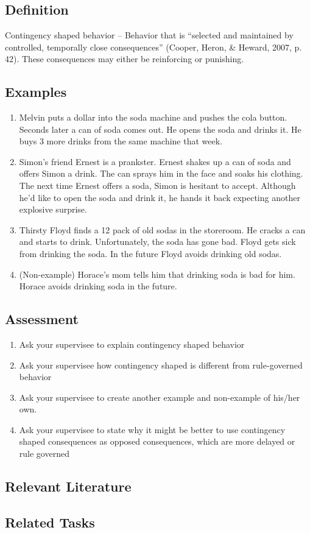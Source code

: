 \clearpage \section{\fourFKFourtyOne{}}
\subsection{Definition}
Contingency shaped behavior – Behavior that is ``selected and maintained by controlled, temporally close consequences'' (Cooper, Heron, \& Heward, 2007, p. 42).  These consequences may either be reinforcing or punishing.  
%
\subsection{Examples}
\begin{enumerate}
\item Melvin puts a dollar into the soda machine and pushes the cola button. Seconds later a can of soda comes out. He opens the soda and drinks it.  He buys 3 more drinks from the same machine that week.
\item Simon's friend Ernest is a prankster.  Ernest shakes up a can of soda and offers Simon a drink.  The can sprays him in the face and soaks his clothing.  The next time Ernest offers a soda, Simon is hesitant to accept.  Although he'd like to open the soda and drink it, he hands it back expecting another explosive surprise.
\item Thirsty Floyd finds a 12 pack of old sodas in the storeroom.  He cracks a can and starts to drink. Unfortunately, the soda has gone bad. Floyd gets sick from drinking the soda. In the future Floyd avoids drinking old sodas.
\item (Non-example) Horace's mom tells him that drinking soda is bad for him. Horace avoids drinking soda in the future.
%
\end{enumerate}
%
\subsection{Assessment}
\begin{enumerate}
\item Ask your supervisee to explain contingency shaped behavior 
\item Ask your supervisee how contingency shaped is different from rule-governed behavior
\item Ask your supervisee to create another example and non-example of his/her own. 
\item Ask your supervisee to state why it might be better to use contingency shaped consequences as opposed consequences, which are more delayed or rule governed      
\end{enumerate}
%
\subsection{Relevant Literature}
\begin{refsection}
\nocite{cooper2007applied,
        malott2003principles,
        michael2004concepts}
\printbibliography[heading=none]
\end{refsection}
%
\subsection{Related Tasks}
\foureFour{}\\
\fourFKFourtyTwo{}\\
